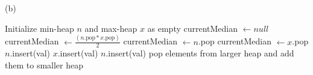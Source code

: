 \documentclass[12pt]{article}
\begin{document}
\newpage
(b) \begin{algorithmic}
    \State Initialize min-heap $n$ and max-heap $x$ as empty 
    \State currentMedian $\gets null$
            \State currentMedian $\gets \frac{(n.\text{pop}*x.\text{pop})}{2}$
            \State currentMedian $\gets n$.pop
            \State currentMedian $\gets x$.pop
        \EndIf
    \EndProcedure
            \State $n$.insert(val)
            \State $x$.insert(val)
        \Else
            \State $n$.insert(val)
        \EndIf
            \State pop elements from larger heap and add them to smaller heap
        \EndWhile
    \EndProcedure
\end{algorithmic}
\end{document}

